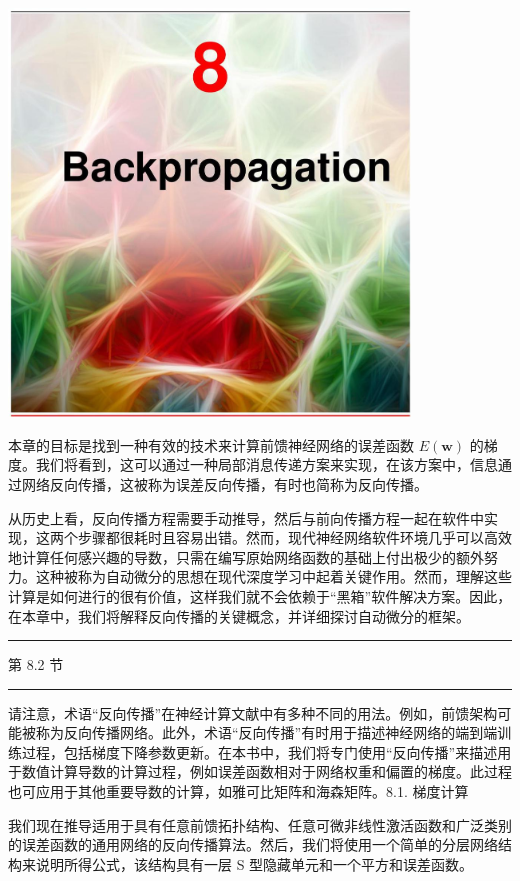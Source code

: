\documentclass[10pt]{article}
\newcommand{\HRule}{\begin{center}\rule{0.9\linewidth}{0.2mm}\end{center}}
\begin{document}
\begin{center}
\includegraphics[max width=0.8\textwidth]{images/0194e279-9b28-703a-88f4-c3ac21e2010d_252_474_348_1074_1089_0.jpg}
\end{center}
\hspace*{3em} 

本章的目标是找到一种有效的技术来计算前馈神经网络的误差函数 \(E\left( \mathbf{w}\right)\) 的梯度。我们将看到，这可以通过一种局部消息传递方案来实现，在该方案中，信息通过网络反向传播，这被称为误差反向传播，有时也简称为反向传播。

从历史上看，反向传播方程需要手动推导，然后与前向传播方程一起在软件中实现，这两个步骤都很耗时且容易出错。然而，现代神经网络软件环境几乎可以高效地计算任何感兴趣的导数，只需在编写原始网络函数的基础上付出极少的额外努力。这种被称为自动微分的思想在现代深度学习中起着关键作用。然而，理解这些计算是如何进行的很有价值，这样我们就不会依赖于“黑箱”软件解决方案。因此，在本章中，我们将解释反向传播的关键概念，并详细探讨自动微分的框架。

\HRule

第 8.2 节

\HRule

请注意，术语“反向传播”在神经计算文献中有多种不同的用法。例如，前馈架构可能被称为反向传播网络。此外，术语“反向传播”有时用于描述神经网络的端到端训练过程，包括梯度下降参数更新。在本书中，我们将专门使用“反向传播”来描述用于数值计算导数的计算过程，例如误差函数相对于网络权重和偏置的梯度。此过程也可应用于其他重要导数的计算，如雅可比矩阵和海森矩阵。8.1. 梯度计算

我们现在推导适用于具有任意前馈拓扑结构、任意可微非线性激活函数和广泛类别的误差函数的通用网络的反向传播算法。然后，我们将使用一个简单的分层网络结构来说明所得公式，该结构具有一层 S 型隐藏单元和一个平方和误差函数。
\end{document}
